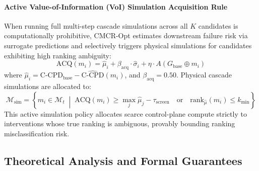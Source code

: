 \documentclass[pdflatex,sn-mathphys-num]{sn-jnl}
\theoremstyle{thmstyleone}
\theoremstyle{thmstyletwo}
\theoremstyle{thmstylethree}
\begin{document}
\paragraph{Active Value-of-Information (VoI) Simulation Acquisition Rule}
When running full multi-step cascade simulations across all $K$ candidates is computationally prohibitive, CMCR-Opt estimates downstream failure risk via surrogate predictions and selectively triggers physical simulations for candidates exhibiting high ranking ambiguity:
\begin{equation}
\mathrm{ACQ}(m_i) = \hat{\mu}_i + \beta_{\mathrm{acq}} \cdot \hat{\sigma}_i + \eta \cdot A(G_{\mathrm{base}} \oplus m_i)
\end{equation}
where $\hat{\mu}_i = \mathrm{C\text{-}CPD}_{\mathrm{base}} - \hat{\mathrm{C\text{-}CPD}}(m_i)$, and $\beta_{\mathrm{acq}} = 0.50$. Physical cascade simulations are allocated to:
\begin{equation}
\mathcal{M}_{\mathrm{sim}} = \left\{ m_i \in \mathcal{M}_t \;\middle|\; \mathrm{ACQ}(m_i) \ge \max_{j} \hat{\mu}_j - \tau_{\mathrm{screen}} \quad \text{or} \quad \mathrm{rank}_{\hat{\mu}}(m_i) \le k_{\min} \right\}
\end{equation}
This active simulation policy allocates scarce control-plane compute strictly to interventions whose true ranking is ambiguous, provably bounding ranking misclassification risk.

\subsection{Theoretical Analysis and Formal Guarantees}
\end{document}
